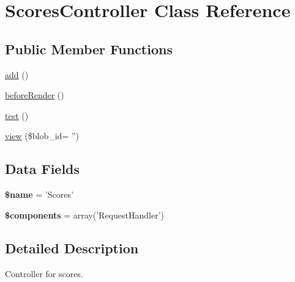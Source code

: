 \hypertarget{class_scores_controller}{
\section{ScoresController Class Reference}
\label{class_scores_controller}
}
\subsection*{Public Member Functions}
\begin{DoxyCompactItemize}
\item 
\hyperlink{class_scores_controller_a837ba24a1c3095ae67613238d866f79a}{add} ()
\item 
\hyperlink{class_scores_controller_ac89dd29d2229bbc37879d31f95d06e97}{beforeRender} ()
\item 
\hyperlink{class_scores_controller_ad69dd4607977cae05ebe19d1ae604fb1}{test} ()
\item 
\hyperlink{class_scores_controller_a82afb1e6c361be60e0ec7e239ea40a93}{view} (\$blob\_\-id= '')
\end{DoxyCompactItemize}
\subsection*{Data Fields}
\begin{DoxyCompactItemize}
\item 
\hypertarget{class_scores_controller_ab2fc40d43824ea3e1ce5d86dee0d763b}{
{\bfseries \$name} = 'Scores'}
\label{class_scores_controller_ab2fc40d43824ea3e1ce5d86dee0d763b}

\item 
\hypertarget{class_scores_controller_a2409c247baf67a1d4c6b9a1789cfc088}{
{\bfseries \$components} = array('RequestHandler')}
\label{class_scores_controller_a2409c247baf67a1d4c6b9a1789cfc088}

\end{DoxyCompactItemize}


\subsection{Detailed Description}
Controller for scores. 

